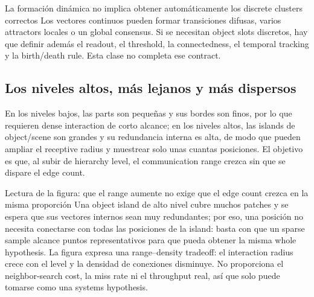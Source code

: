 \begin{warningbox}{La formación dinámica no implica obtener automáticamente los discrete clusters correctos}
Los vectores continuos pueden formar transiciones difusas, varios attractors locales o un global consensus. Si se necesitan object slots discretos, hay que definir además el readout, el threshold, la connectedness, el temporal tracking y la birth/death rule. Esta clase no completa ese contract.
\end{warningbox}

\subsection{Los niveles altos, más lejanos y más dispersos}

En los niveles bajos, las parts son pequeñas y sus bordes son finos, por lo que requieren dense interaction de corto alcance; en los niveles altos, las islands de object/scene son grandes y su redundancia interna es alta, de modo que pueden ampliar el receptive radius y muestrear solo unas cuantas posiciones. El objetivo es que, al subir de hierarchy level, el communication range crezca sin que se dispare el edge count.


\begin{knowledgebox}{Lectura de la figura: que el range aumente no exige que el edge count crezca en la misma proporción}
Una object island de alto nivel cubre muchos patches y se espera que sus vectores internos sean muy redundantes; por eso, una posición no necesita conectarse con todas las posiciones de la island: basta con que un sparse sample alcance puntos representativos para que pueda obtener la misma whole hypothesis. La figura expresa una range--density tradeoff: el interaction radius crece con el level y la densidad de conexiones disminuye. No proporciona el neighbor-search cost, la miss rate ni el throughput real, así que solo puede tomarse como una systems hypothesis.
\end{knowledgebox}


